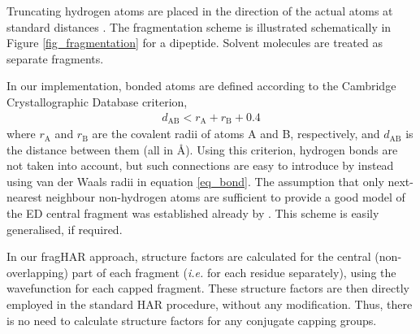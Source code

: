 \documentclass[preprint,dvipsnames]{iucr}              %
\newcommand{\s}[1]{{\textrm{#1}}}
\begin{document}
Truncating hydrogen atoms are placed in the direction 
of the actual atoms at standard distances \cite{allen2010bond}. 
The fragmentation scheme is illustrated schematically in Figure \ref{fig_fragmentation}
for a dipeptide. 
Solvent molecules are treated as separate fragments. 
 
In our implementation, bonded atoms are defined according to 
the Cambridge Crystallographic Database criterion,
\begin{align}
d_\s{AB} < r_\s{A} + r_\s{B} + 0.4
\label{eq_bond}
\end{align}
where $r_\s{A}$ and $r_\s{B}$ are the covalent radii of atoms A and B,
respectively, and $d_\s{AB}$ is the distance between them (all in \AA). Using this 
criterion, hydrogen bonds are not taken into account, but such  
connections are easy to introduce by instead using van der Waals radii in 
equation \ref{eq_bond}. 
The assumption that only next-nearest neighbour 
non-hydrogen atoms are sufficient to provide a good model of the ED
central fragment was established already 
by .
This scheme is easily generalised, if required. 

In our fragHAR approach, structure factors are calculated for the central (non-overlapping) part of each fragment ({\em i.e.} for each residue separately), using the wavefunction for each capped fragment. 
These structure factors are then directly employed in the standard HAR procedure, without any modification.
Thus, there is no need to calculate structure factors for any conjugate capping groups.
\end{document}
